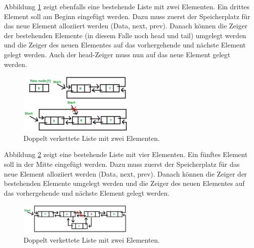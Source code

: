 Abbildung \ref{fig:Doubly_Linked_List_2_2} zeigt ebenfalls eine bestehende Liste mit zwei Elementen. Ein drittes Element soll am Beginn eingefügt werden. Dazu muss zuerst der Speicherplatz für das neue Element alloziiert werden (Data, next, prev). Danach können die Zeiger der bestehenden Elemente (in diesem Falle noch head und tail) umgelegt werden und die Zeiger des neuen Elementes auf das vorhergehende und nächste Element gelegt werden. Auch der head-Zeiger muss nun auf das neue Element gelegt werden.

\begin{figure}[h!]
	\centering
	\includegraphics[width=0.5\textwidth]{graphics/Doubly_Linked_List_2_2}
	\caption{Doppelt verkettete Liste mit zwei Elementen.}
	\label{fig:Doubly_Linked_List_2_2}
\end{figure}


Abbildung \ref{fig:Doubly_Linked_List_2_3} zeigt eine bestehende Liste mit vier Elementen. Ein fünftes Element soll in der Mitte eingefügt werden. Dazu muss zuerst der Speicherplatz für das neue Element alloziiert werden (Data, next, prev). Danach können die Zeiger der bestehenden Elemente umgelegt werden und die Zeiger des neuen Elementes auf das vorhergehende und nächste Element gelegt werden.

\begin{figure}[h!]
	\centering
	\includegraphics[width=0.5\textwidth]{graphics/Doubly_Linked_List_2_3}
	\caption{Doppelt verkettete Liste mit zwei Elementen.}
	\label{fig:Doubly_Linked_List_2_3}
\end{figure}

